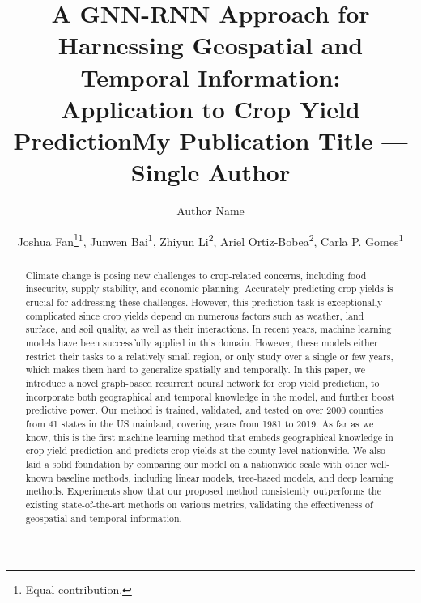 \documentclass[letterpaper]{article} %
\title{A GNN-RNN Approach for Harnessing Geospatial and Temporal Information:\\  Application to  Crop Yield Prediction}
\title{My Publication Title --- Single Author}
\author {
    Author Name
}
\author{
    Joshua Fan\thanks{Equal contribution.}\textsuperscript{\rm 1}, Junwen Bai\footnotemark[1]\textsuperscript{\rm 1},  Zhiyun Li\footnotemark[1]\textsuperscript{\rm 2},  Ariel Ortiz-Bobea\textsuperscript{\rm 2}, Carla P. Gomes\textsuperscript{\rm 1}\\
}
\begin{document}
\maketitle

\begin{abstract}
Climate change is posing new challenges to crop-related concerns, including food insecurity, supply stability, and economic planning. Accurately predicting crop yields is crucial for addressing these challenges. However, this prediction task is exceptionally complicated since crop yields depend on numerous factors such as weather, land surface, and soil quality, as well as their interactions. In recent years, machine learning models have been successfully applied in this domain. However, these models either restrict their tasks to a relatively small region, or only study over a single or few years, which makes them hard to generalize spatially and temporally. In this paper, we introduce a novel graph-based recurrent neural network for crop yield prediction, to incorporate both geographical and temporal knowledge in the model, and further boost predictive power. Our method is trained, validated, and tested on over 2000 counties from 41 states in the US mainland, covering years from 1981 to 2019. As far as we know, this is the first machine learning method that embeds geographical knowledge in crop yield prediction and predicts crop yields at the county level nationwide. We also laid a solid foundation by comparing our model on a nationwide scale with other well-known baseline methods, including linear models, tree-based models, and deep learning methods. Experiments show that our proposed method consistently outperforms the existing state-of-the-art methods on various metrics, validating the effectiveness of geospatial and temporal information. 


\end{abstract}
\end{document}

